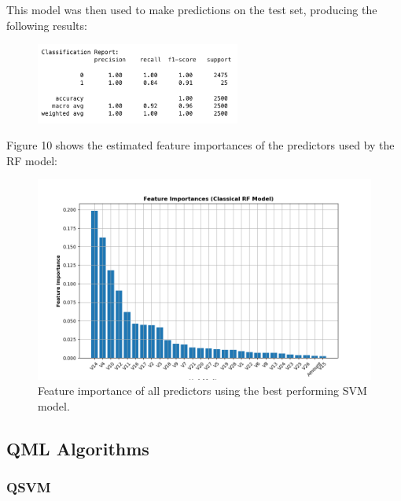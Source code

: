 \documentclass[11pt, oneside]{article}   	%
\begin{document}
This model was then used to make predictions on the test set, producing the following results:

\begin{figure}[h!]
	\centering
	\includegraphics[width=0.6\textwidth]{figures/rf_results.png}
\end{figure}

Figure 10 shows the estimated feature importances of the predictors used by the RF model: 

\begin{figure}[h!]
    \centering
    \includegraphics[width=1\textwidth]{figures/fig_10.png}
    \captionsetup{font=small} 
    \caption{Feature importance of all predictors using the best performing SVM model.}
    \label{fig10}
\end{figure}




\subsection{QML Algorithms}
\subsubsection{QSVM}
\end{document}
